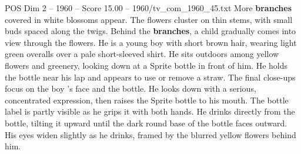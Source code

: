 \begin{textsample}{POS Dim 2 – 1960 – Score 15.00 – 1960/tv\_com\_1960\_45.txt}
More \textbf{branches} covered in white blossoms appear.
The flowers cluster on thin stems, with small buds spaced along the twigs.
Behind the \textbf{branches}, a child gradually comes into view through the flowers.
He is a young boy with short brown hair, wearing light green overalls over a pale short-sleeved shirt.
He sits outdoors among yellow flowers and greenery, looking down at a Sprite bottle in front of him.
He holds the bottle near his lap and appears to use or remove a straw.
The final close-ups focus on the boy ’s face and the bottle.
He looks down with a serious, concentrated expression, then raises the Sprite bottle to his mouth.
The bottle label is partly visible as he grips it with both hands.
He drinks directly from the bottle, tilting it upward until the dark round base of the bottle faces outward.
His eyes widen slightly as he drinks, framed by the blurred yellow flowers behind him.

\end{textsample}
